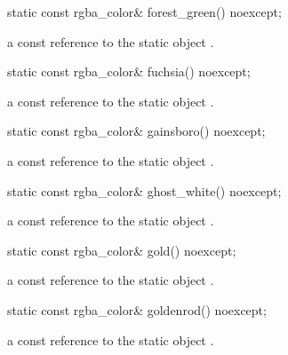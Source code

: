 \begin{itemdecl}
static const rgba_color& forest_green() noexcept;
\end{itemdecl}
\begin{itemdescr}
\pnum
\returns
a const reference to the static  object .
\end{itemdescr}

\begin{itemdecl}
static const rgba_color& fuchsia() noexcept;
\end{itemdecl}
\begin{itemdescr}
\pnum
\returns
a const reference to the static  object .
\end{itemdescr}

\begin{itemdecl}
static const rgba_color& gainsboro() noexcept;
\end{itemdecl}
\begin{itemdescr}
\pnum
\returns
a const reference to the static  object .
\end{itemdescr}

\begin{itemdecl}
static const rgba_color& ghost_white() noexcept;
\end{itemdecl}
\begin{itemdescr}
\pnum
\returns
a const reference to the static  object .
\end{itemdescr}

\begin{itemdecl}
static const rgba_color& gold() noexcept;
\end{itemdecl}
\begin{itemdescr}
\pnum
\returns
a const reference to the static  object .
\end{itemdescr}

\begin{itemdecl}
static const rgba_color& goldenrod() noexcept;
\end{itemdecl}
\begin{itemdescr}
\pnum
\returns
a const reference to the static  object .
\end{itemdescr}

